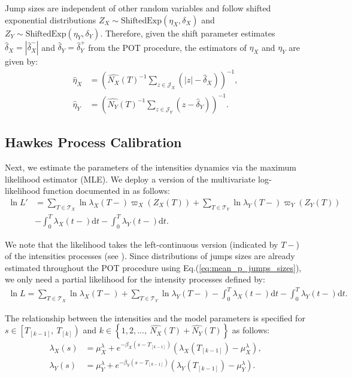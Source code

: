 \documentclass{article}
\newcommand{\diff}{\mathrm{d}}
\theoremstyle{definition}
\begin{document}
Jump sizes are independent of other random variables and follow shifted exponential distributions $Z_X \sim \text{ShiftedExp}(\eta_X, \delta_X)$ and $Z_Y \sim \text{ShiftedExp}(\eta_Y, \delta_Y)$. 
Therefore, given the shift parameter estimates $\widehat \delta_X = |\widehat \delta_X^-|$ and $\widehat \delta_Y = \widehat \delta_Y^+$ from the POT procedure, the estimators of $\eta_X$ and $\eta_Y$ are given by:
\begin{equation}\label{eq:mean_p_jumps_sizes}
   \begin{split}
\widehat \eta_X &= \left(\widehat{N_X}(T)^{-1} \sum_{z \in \mathcal{J}_X}\left(|z| - \widehat \delta_X\right)\right)^{-1},\\
\widehat \eta_Y &= \left(\widehat{N_Y}(T)^{-1} \sum_{z \in \mathcal{J}_Y}\left(z - \widehat \delta_Y\right)\right)^{-1}. 
   \end{split}
\end{equation}

\subsection{Hawkes Process Calibration}

Next, we estimate the parameters of the intensities dynamics via the maximum likelihood estimator (MLE). We deploy a version of the multivariate log-likelihood function documented in \cite{embrechts2011multivariate} as follows:
\begin{align}
 \ln L' &= \sum_{T \in \mathcal{T}_X} \ln \lambda_X(T-)\varpi_X(Z_X(T))
         + \sum_{T \in \mathcal{T}_Y} \ln \lambda_Y(T-)\varpi_Y(Z_Y(T)) \nonumber\\
 &- \int_0^T \lambda_X(t-)\diff t 
 - \int_0^T \lambda_Y(t-)\diff t.
\end{align}

We note that the likelihood takes the left-continuous version (indicated by $T-$) of the intensities processes (see \citep[p. 232]{daley2003introduction}). Since distributions of jumps sizes are already estimated throughout the POT procedure using Eq.(\ref{eq:mean_p_jumps_sizes}), we only need a partial likelihood for the intensity processes defined by: 
\begin{align}
 \ln L = \sum_{T \in \mathcal{T}_X} \ln \lambda_X(T-)
 + 
  \sum_{T \in \mathcal{T}_Y} \ln \lambda_Y(T-)
 - \int_0^T \lambda_X(t-)\diff t
 - \int_0^T \lambda_Y(t-)\diff t. \label{eq:likelihood}
\end{align}

The relationship between the intensities and the model parameters is specified for $s \in \left[T_{[k-1]},\ T_{[k]}\right)$ and $k \in \left\{1,2,...,\ \widehat{N_X}(T)+\widehat{N_Y}(T)\right\}$ as follows:
\begin{align}
 \lambda_X(s) &= \mu_X^\lambda + e^{-\beta_X\left(s - T_{[k-1]}\right)}\left(\lambda_X(T_{[k-1]})-\mu_X^\lambda\right),\\
 \lambda_Y(s) &= \mu_Y^\lambda + e^{-\beta_Y\left(s - T_{[k-1]}\right)}\left(\lambda_Y(T_{[k-1]})-\mu_Y^\lambda\right).
\end{align}
\end{document}
